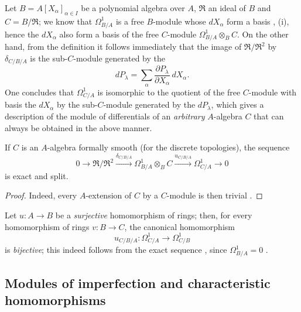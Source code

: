 \begin{example}[20.5.13]
\label{0.20.5.13}
Let $B=A[X_\alpha]_{\alpha\in I}$ be a polynomial algebra over $A$, $\mathfrak{R}$ an ideal of $B$ and $C=B/\mathfrak{R}$; we know that $\Omega^1_{B/A}$ is a free $B$-module whose $dX_\alpha$ form a basis , (i), hence the $dX_\alpha$ also form a basis of the free $C$-module $\Omega^1_{B/A}\otimes_B C$.
On the other hand, from the definition it follows immediately that the image of $\mathfrak{R}/\mathfrak{R}^2$ by $\delta_{C/B/A}$ is the sub-$C$-module generated by the
\[
  dP_\lambda=\sum_\alpha\frac{\partial P_\lambda}{\partial X_\alpha}\,dX_\alpha.
\]
One concludes that $\Omega^1_{C/A}$ is isomorphic to the quotient of the free $C$-module with basis the $dX_\alpha$ by the sub-$C$-module generated by the $dP_\lambda$, which gives a description of the module of differentials of an \emph{arbitrary} $A$-algebra $C$ that can always be obtained in the above manner.
\end{example}

\begin{corollary}[20.5.14]
\label{0.20.5.14}
If $C$ is an $A$-algebra formally smooth \textup{(}for the discrete topologies\textup{)}, the sequence
\begin{equation}
\tag{20.5.14.1}
  \label{0.20.5.14.1}
  0\to\mathfrak{R}/\mathfrak{R}^2\xrightarrow{\delta_{C/B/A}}\Omega^1_{B/A}\otimes_B C\xrightarrow{u_{C/B/A}}\Omega^1_{C/A}\to 0
\end{equation}
is exact and split.
\end{corollary}

\begin{proof}
Indeed, every $A$-extension of $C$ by a $C$-module is then trivial .
\end{proof}

\begin{remark}[20.5.15]
\label{0.20.5.15}
Let $u:A\to B$ be a \emph{surjective} homomorphism of rings; then, for every homomorphism of rings $v:B\to C$, the canonical homomorphism
\begin{equation}
\tag{20.5.15.1}
  \label{0.20.5.15.1}
  u_{C/B/A}:\Omega^1_{C/A}\to\Omega^1_{C/B}
\end{equation}
is \emph{bijective}; this indeed follows from the exact sequence , since $\Omega^1_{B/A}=0$ .
\end{remark}

\subsection{Modules of imperfection and characteristic homomorphisms}
\label{subsection:0.20.6}

